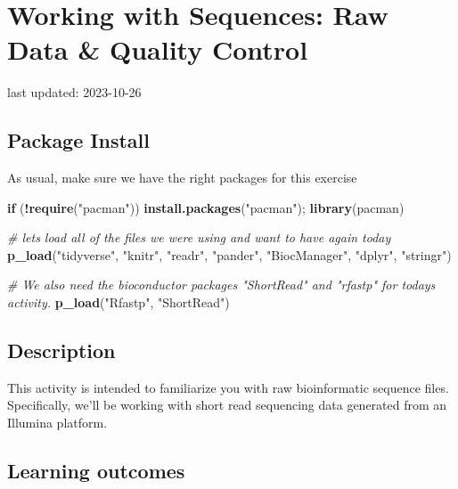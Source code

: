 \documentclass[
]{book}
\newenvironment{Shaded}{\begin{snugshade}}{\end{snugshade}}
\newcommand{\CommentTok}[1]{\textcolor[rgb]{0.56,0.35,0.01}{\textit{#1}}}
\newcommand{\ControlFlowTok}[1]{\textcolor[rgb]{0.13,0.29,0.53}{\textbf{#1}}}
\newcommand{\FunctionTok}[1]{\textcolor[rgb]{0.13,0.29,0.53}{\textbf{#1}}}
\newcommand{\NormalTok}[1]{#1}
\newcommand{\SpecialCharTok}[1]{\textcolor[rgb]{0.81,0.36,0.00}{\textbf{#1}}}
\newcommand{\StringTok}[1]{\textcolor[rgb]{0.31,0.60,0.02}{#1}}
\begin{document}
\hypertarget{working-with-sequences-raw-data-quality-control}{%
\chapter{Working with Sequences: Raw Data \& Quality Control}\label{working-with-sequences-raw-data-quality-control}}

last updated: 2023-10-26

\hypertarget{package-install}{%
\section{Package Install}\label{package-install}}

As usual, make sure we have the right packages for this exercise

\begin{Shaded}
\begin{Highlighting}[]
\ControlFlowTok{if}\NormalTok{ (}\SpecialCharTok{!}\FunctionTok{require}\NormalTok{(}\StringTok{"pacman"}\NormalTok{)) }\FunctionTok{install.packages}\NormalTok{(}\StringTok{"pacman"}\NormalTok{); }\FunctionTok{library}\NormalTok{(pacman)}

\CommentTok{\# let\textquotesingle{}s load all of the files we were using and want to have again today}
\FunctionTok{p\_load}\NormalTok{(}\StringTok{"tidyverse"}\NormalTok{, }\StringTok{"knitr"}\NormalTok{, }\StringTok{"readr"}\NormalTok{,}
       \StringTok{"pander"}\NormalTok{, }\StringTok{"BiocManager"}\NormalTok{, }
       \StringTok{"dplyr"}\NormalTok{, }\StringTok{"stringr"}\NormalTok{)}

\CommentTok{\# We also need the bioconductor packages "ShortRead" and "rfastp" for today\textquotesingle{}s activity.}
\FunctionTok{p\_load}\NormalTok{(}\StringTok{"Rfastp"}\NormalTok{, }\StringTok{"ShortRead"}\NormalTok{)}
\end{Highlighting}
\end{Shaded}

\hypertarget{description-1}{%
\section{Description}\label{description-1}}

This activity is intended to familiarize you with raw bioinformatic sequence files. Specifically, we'll be working with short read sequencing data generated from an Illumina platform.

\hypertarget{learning-outcomes-2}{%
\section{Learning outcomes}\label{learning-outcomes-2}}
\end{document}
